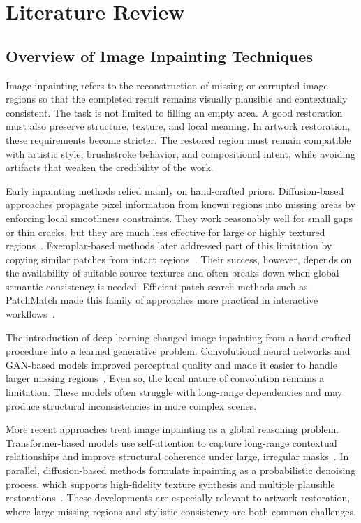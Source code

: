 \documentclass[12pt, twoside]{report}
\begin{document}
\chapter{Literature Review}

\section{Overview of Image Inpainting Techniques}

Image inpainting refers to the reconstruction of missing or corrupted image regions so that the completed result remains visually plausible and contextually consistent. The task is not limited to filling an empty area. A good restoration must also preserve structure, texture, and local meaning. In artwork restoration, these requirements become stricter. The restored region must remain compatible with artistic style, brushstroke behavior, and compositional intent, while avoiding artifacts that weaken the credibility of the work.

Early inpainting methods relied mainly on hand-crafted priors. Diffusion-based approaches propagate pixel information from known regions into missing areas by enforcing local smoothness constraints. They work reasonably well for small gaps or thin cracks, but they are much less effective for large or highly textured regions~\cite{bertalmio2000inpainting}. Exemplar-based methods later addressed part of this limitation by copying similar patches from intact regions~\cite{criminisi2004exemplar}. Their success, however, depends on the availability of suitable source textures and often breaks down when global semantic consistency is needed. Efficient patch search methods such as PatchMatch made this family of approaches more practical in interactive workflows~\cite{barnes2009patchmatch}.

The introduction of deep learning changed image inpainting from a hand-crafted procedure into a learned generative problem. Convolutional neural networks and GAN-based models improved perceptual quality and made it easier to handle larger missing regions~\cite{pathak2016context,iizuka2017global}. Even so, the local nature of convolution remains a limitation. These models often struggle with long-range dependencies and may produce structural inconsistencies in more complex scenes.

More recent approaches treat image inpainting as a global reasoning problem. Transformer-based models use self-attention to capture long-range contextual relationships and improve structural coherence under large, irregular masks~\cite{zeng2022zits,li2022mat}. In parallel, diffusion-based methods formulate inpainting as a probabilistic denoising process, which supports high-fidelity texture synthesis and multiple plausible restorations~\cite{lugmayr2022repaint,rombach2022ldm}. These developments are especially relevant to artwork restoration, where large missing regions and stylistic consistency are both common challenges.
\end{document}
